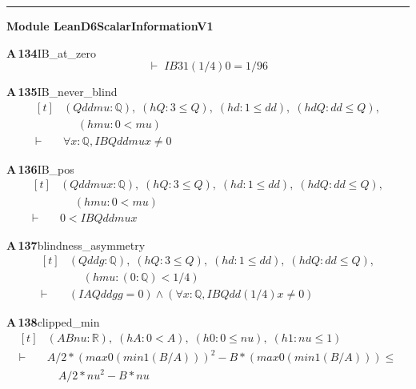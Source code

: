 \documentclass[conference]{IEEEtran}
\theoremstyle{definition}
\newcommand{\lean}[1]{\textsf{\footnotesize #1}}
\begin{document}
\vspace{4pt}\noindent\rule{\columnwidth}{0.4pt}\par\vspace{2pt}
\noindent\textbf{Module \lean{LeanD6ScalarInformationV1}}\par\vspace{3pt}

\noindent\textbf{A\,134}\quad\lean{IB\_at\_zero}
{\footnotesize\[ \vdash\; \mathit{IB} 3 1 (1/4) 0 = 1/96 \]}

\noindent\textbf{A\,135}\quad\lean{IB\_never\_blind}
{\footnotesize\[ \begin{aligned}[t]
&(\mathit{Q} \mathit{dd} \mathit{mu} : \mathbb{Q} ),\; (\mathit{hQ} : 3 \leq \mathit{Q}),\; (\mathit{hd} : 1 \leq \mathit{dd}),\; (\mathit{hdQ} : \mathit{dd} \leq \mathit{Q}),\\
&\quad \; (\mathit{hmu} : 0 < \mathit{mu})\\
\vdash\;&\forall \mathit{x} : \mathbb{Q} , \mathit{IB} \mathit{Q} \mathit{dd} \mathit{mu} \mathit{x} \neq 0
\end{aligned} \]}

\noindent\textbf{A\,136}\quad\lean{IB\_pos}
{\footnotesize\[ \begin{aligned}[t]
&(\mathit{Q} \mathit{dd} \mathit{mu} \mathit{x} : \mathbb{Q} ),\; (\mathit{hQ} : 3 \leq \mathit{Q}),\; (\mathit{hd} : 1 \leq \mathit{dd}),\; (\mathit{hdQ} : \mathit{dd} \leq \mathit{Q}),\\
&\quad \; (\mathit{hmu} : 0 < \mathit{mu})\\
\vdash\;&0 < \mathit{IB} \mathit{Q} \mathit{dd} \mathit{mu} \mathit{x}
\end{aligned} \]}

\noindent\textbf{A\,137}\quad\lean{blindness\_asymmetry}
{\footnotesize\[ \begin{aligned}[t]
&(\mathit{Q} \mathit{dd} \mathit{g} : \mathbb{Q} ),\; (\mathit{hQ} : 3 \leq \mathit{Q}),\; (\mathit{hd} : 1 \leq \mathit{dd}),\; (\mathit{hdQ} : \mathit{dd} \leq \mathit{Q}),\\
&\quad \; (\mathit{hmu} : (0:\mathbb{Q} ) < 1/4)\\
\vdash\;&(\mathit{IA} \mathit{Q} \mathit{dd} \mathit{g} \mathit{g} = 0) \wedge (\forall \mathit{x} : \mathbb{Q} , \mathit{IB} \mathit{Q} \mathit{dd} (1/4) \mathit{x} \neq 0)
\end{aligned} \]}

\noindent\textbf{A\,138}\quad\lean{clipped\_min}
{\footnotesize\[ \begin{aligned}[t]
&(\mathit{A} \mathit{B} \mathit{nu} : \mathbb{R} ),\; (\mathit{hA} : 0 < \mathit{A}),\; (\mathit{h0} : 0 \leq \mathit{nu}),\; (\mathit{h1} : \mathit{nu} \leq 1)\\
\vdash\;&\mathit{A} / 2 * (\mathit{max} 0 (\mathit{min} 1 (\mathit{B} / \mathit{A}))) ^{2} - \mathit{B} * (\mathit{max} 0 (\mathit{min} 1 (\mathit{B} / \mathit{A}))) \leq\\
&\quad \mathit{A} / 2 * \mathit{nu} ^{2} - \mathit{B} * \mathit{nu}
\end{aligned} \]}
\end{document}
